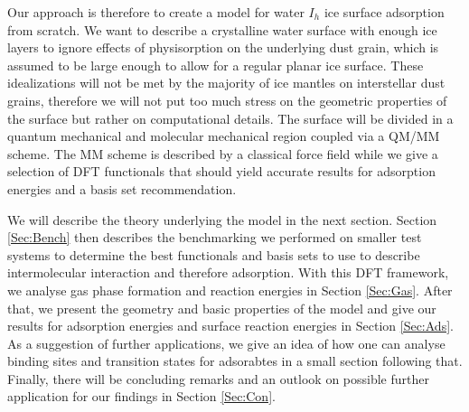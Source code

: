 \documentclass[8.5pt,twoside,twocolumn]{article}
\theoremstyle{standard}
\begin{document}
Our approach is therefore to create a model for water $I_h$ ice surface
adsorption from scratch. We want to describe a crystalline water surface with
enough ice layers to ignore effects of physisorption on the underlying dust
grain, which is assumed to be large enough to allow for a regular planar ice
surface. These idealizations will not be met by the majority of ice mantles on
interstellar dust grains, therefore we will not put too much stress on the
geometric properties of the surface but rather on computational details. The
surface will be divided in a quantum mechanical and molecular mechanical region
coupled via a QM/MM scheme. The MM scheme is described by a classical force
field while we give a selection of DFT functionals that should yield accurate
results for adsorption energies and a basis set recommendation.
% 

We will describe the theory underlying the model in the next section. Section
\ref{Sec:Bench} then describes the benchmarking we performed on smaller test
systems to determine the best functionals and basis sets to use to describe
intermolecular interaction and therefore adsorption. With this DFT
framework, we analyse gas phase formation and reaction energies in Section
\ref{Sec:Gas}. After that, we present the geometry and basic properties of the
model and give our results for adsorption energies and surface reaction
energies in Section \ref{Sec:Ads}. As a suggestion of further applications, we
give an idea of how one can analyse binding sites and transition states for
adsorabtes in a small section following that. Finally, there will be concluding
remarks and an outlook on possible further application for our findings in
Section \ref{Sec:Con}.
\end{document}
